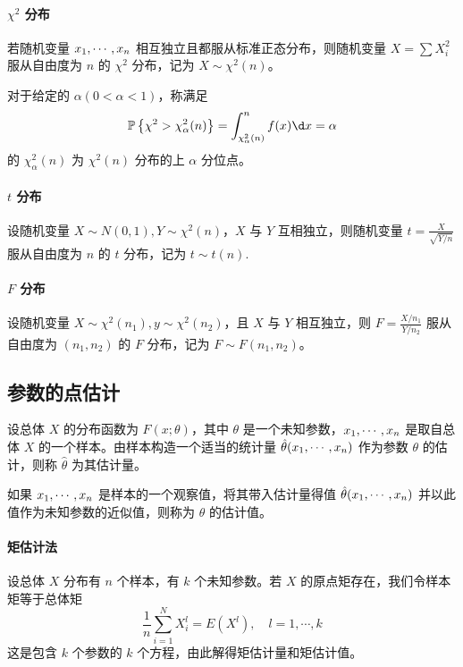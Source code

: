 \paragraph{$\chi^2$ 分布}

若随机变量 $x_1,\cdots,x_n$ 相互独立且都服从标准正态分布，则随机变量 $X = \sum X_i^2$ 服从自由度为 $n$ 的 $\chi^2$ 分布，记为 $X \sim \chi^2(n)$。

对于给定的 $\alpha(0 < \alpha < 1)$，称满足
\[ \bbP\left\{\chi^2 > \chi_\alpha^2(n)\right\} = \int_{\chi_\alpha^2(n)}^n f(x) \d x = \alpha  \]
的 $\chi_\alpha^2(n)$ 为 $\chi^2(n)$ 分布的上 $\alpha$ 分位点。

\paragraph{$t$ 分布}

设随机变量 $X \sim N(0, 1), Y \sim \chi^2(n)$，$X$ 与 $Y$ 互相独立，则随机变量 $t = \frac{X}{\sqrt{Y / n}}$ 服从自由度为 $n$ 的 $t$ 分布，记为 $t \sim t(n)$.

\paragraph{$F$ 分布}

设随机变量 $X \sim \chi^2(n_1), y \sim \chi^2(n_2)$，且 $X$ 与 $Y$ 相互独立，则 $F = \frac{X / n_1}{Y / n_2}$ 服从自由度为 $(n_1, n_2)$ 的 $F$ 分布，记为 $F \sim F(n_1, n_2)$。

\subsection{参数的点估计}

设总体 $X$ 的分布函数为 $F(x; \theta)$，其中 $\theta$ 是一个未知参数，$x_1,\cdots,x_n$ 是取自总体 $X$ 的一个样本。由样本构造一个适当的统计量 $\hat{\theta}(x_1,\cdots,x_n)$ 作为参数 $\theta$ 的估计，则称 $\hat{\theta}$ 为其估计量。

如果 $x_1,\cdots,x_n$ 是样本的一个观察值，将其带入估计量得值 $\hat{\theta}(x_1,\cdots,x_n)$ 并以此值作为未知参数的近似值，则称为 $\theta$ 的估计值。

\paragraph{矩估计法}

设总体 $X$ 分布有 $n$ 个样本，有 $k$ 个未知参数。若 $X$ 的原点矩存在，我们令样本矩等于总体矩
\[ \frac{1}{n} \sum_{i=1}^{N} X_i^l = E(X^l), \quad l = 1, \cdots, k \]
这是包含 $k$ 个参数的 $k$ 个方程，由此解得矩估计量和矩估计值。

